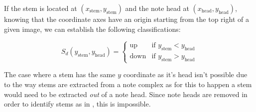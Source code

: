 If the stem is located at $(x_{\text{stem}}, y_{\text{stem}})$ and the note head at $(x_{\text{head}}, y_{\text{head}})$, knowing that the coordinate axes have an origin starting from the top right of a given image, we can establish the following classifications:

$$
S_{d} (y_{\text{stem}}, y_{\text{head}}) =
\left\{
    \begin{array}{ll}
        \text{up}   & \mbox{if } y_{\text{stem}} < y_{\text{head}} \\
        \text{down} & \mbox{if } y_{\text{stem}} > y_{\text{head}}
    \end{array}
\right.
$$

The case where a stem has the same $y$ coordinate as it's head isn't possible due to the way stems are extracted from a note complex as for this to happen a stem would need to be extracted \emph{out} of a note head. Since note heads are removed in order to identify stems as in , this is impossible.

